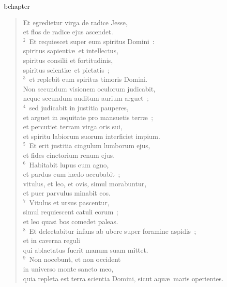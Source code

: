 bchapter\begin{verse}\vspace{-19pt}Et egredietur virga de radice Jesse,\\ et flos de radice ejus ascendet.\\
${}^{2}$~Et requiescet super eum spiritus Domini~:\\ spiritus sapienti\ae\ et intellectus,\\ spiritus consilii et fortitudinis,\\ spiritus scienti\ae\ et pietatis~;\\
${}^{3}$~et replebit eum spiritus timoris Domini.\\ Non secundum visionem oculorum judicabit,\\ neque secundum auditum aurium arguet~;\\
${}^{4}$~sed judicabit in justitia pauperes,\\ et arguet in \ae quitate pro mansuetis terr\ae~;\\ et percutiet terram virga oris sui,\\ et spiritu labiorum suorum interficiet impium.\\
${}^{5}$~Et erit justitia cingulum lumborum ejus,\\ et fides cinctorium renum ejus.\\
${}^{6}$~Habitabit lupus cum agno,\\ et pardus cum h\ae do accubabit~;\\ vitulus, et leo, et ovis, simul morabuntur,\\ et puer parvulus minabit eos.\\
${}^{7}$~Vitulus et ursus pascentur,\\ simul requiescent catuli eorum~;\\ et leo quasi bos comedet paleas.\\
${}^{8}$~Et delectabitur infans ab ubere super foramine aspidis~;\\ et in caverna reguli\\ qui ablactatus fuerit manum suam mittet.\\
${}^{9}$~Non nocebunt, et non occident\\ in universo monte sancto meo,\\ quia repleta est terra scientia Domini, sicut aqu\ae\ maris operientes.\end{verse}


